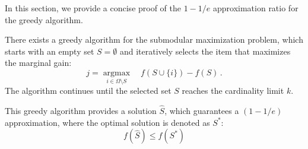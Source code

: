 In this section, we provide a concise proof of the $1 - 1/e$ approximation ratio for the greedy algorithm.
\begin{theorem}
    There exists a greedy algorithm for the submodular maximization problem, which starts with an empty set \( S = \emptyset \) and iteratively selects the item that maximizes the marginal gain:
    \begin{equation}\label{eq:greed_sub}
        j = \mathop{\mathrm{argmax}}\limits_{i \in \Omega \setminus S} \quad f(S \cup \{i\}) - f(S) \,.
    \end{equation}
    The algorithm continues until the selected set \( S \) reaches the cardinality limit \( k \).
    
    This greedy algorithm provides a solution \( \hat{S} \), which guarantees a $(1 - 1/e)$ approximation, where the optimal solution is denoted as \( S^* \):
    \begin{equation}
        f(\hat{S}) \leq f(S^*)
    \end{equation}
\end{theorem}
